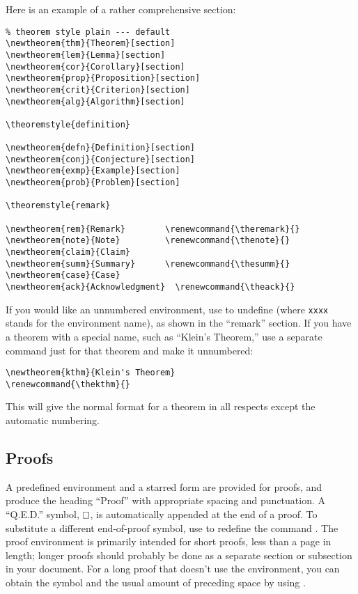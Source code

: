 Here is an example of a rather comprehensive  section:
\begin{verbatim}
% theorem style plain --- default
\newtheorem{thm}{Theorem}[section]
\newtheorem{lem}{Lemma}[section]
\newtheorem{cor}{Corollary}[section]
\newtheorem{prop}{Proposition}[section]
\newtheorem{crit}{Criterion}[section]
\newtheorem{alg}{Algorithm}[section]

\theoremstyle{definition}

\newtheorem{defn}{Definition}[section]
\newtheorem{conj}{Conjecture}[section]
\newtheorem{exmp}{Example}[section]
\newtheorem{prob}{Problem}[section]

\theoremstyle{remark}

\newtheorem{rem}{Remark}        \renewcommand{\theremark}{}
\newtheorem{note}{Note}         \renewcommand{\thenote}{}
\newtheorem{claim}{Claim}
\newtheorem{summ}{Summary}      \renewcommand{\thesumm}{}
\newtheorem{case}{Case}
\newtheorem{ack}{Acknowledgment}  \renewcommand{\theack}{}
\end{verbatim}
If you would like an unnumbered environment, use 
to undefine (where {\tt xxxx}
stands for the environment name), as shown in the
``remark'' section.  If you have a theorem with a special name,
such as ``Klein's Theorem,'' use a separate 
command just for that theorem and make it unnumbered:
\begin{verbatim}
\newtheorem{kthm}{Klein's Theorem}
\renewcommand{\thekthm}{}
\end{verbatim}
This will give the normal format for a theorem in all respects
except the automatic numbering.

\subsection{Proofs}

A predefined  environment and a starred form 
are provided for
proofs, and produce the heading ``Proof'' with appropriate
spacing and punctuation.  A ``Q.E.D.'' symbol,
$\vcenter{\hrule\hbox{\vrule height.6em\kern.6em\vrule}\hrule}$,
is automatically appended at the end of a proof.
To substitute
a different end-of-proof symbol, use 
to redefine the command .
The proof environment is primarily intended for short proofs, less than
a page in length; longer proofs should probably be done as a separate
section or subsection in your document.  For a long
proof that doesn't use the  environment,
you can obtain the symbol and the usual amount of preceding space
by using .

